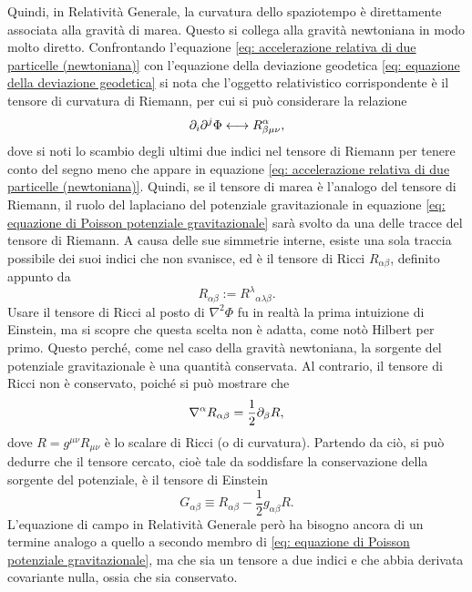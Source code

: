 Quindi, in Relatività Generale, la curvatura dello spaziotempo è direttamente associata alla gravità di marea. Questo si collega alla gravità newtoniana in modo molto diretto. Confrontando l'equazione \eqref{eq: accelerazione relativa di due particelle (newtoniana)} con l'equazione della deviazione geodetica \eqref{eq: equazione della deviazione geodetica} si nota che l'oggetto relativistico corrispondente è il tensore di curvatura di Riemann, per cui si può considerare la relazione 
\begin{equation}
    \partial_i \partial^j \Phi \longleftrightarrow R^{\alpha}_{\beta\mu\nu},
\end{equation}
dove si noti lo scambio degli ultimi due indici nel tensore di Riemann per tenere conto del segno meno che appare in equazione \eqref{eq: accelerazione relativa di due particelle (newtoniana)}. Quindi, se il tensore di marea è l'analogo del tensore di Riemann, il ruolo del laplaciano del potenziale gravitazionale in equazione \eqref{eq: equazione di Poisson potenziale gravitazionale} sarà svolto da una delle tracce del tensore di Riemann. A causa delle sue simmetrie interne, esiste una sola traccia possibile dei suoi indici che non svanisce, ed è il tensore di Ricci $R_{\alpha\beta}$, definito appunto da
\begin{equation}
    R_{\alpha\beta} := {R^\lambda}_{\alpha\lambda\beta}.
\end{equation}
Usare il tensore di Ricci al posto di $\nabla^2 \Phi$ fu in realtà la prima intuizione di Einstein, ma si scopre che questa scelta non è adatta, come notò Hilbert per primo. Questo perché, come nel caso della gravità newtoniana, la sorgente del potenziale gravitazionale è una quantità conservata. Al contrario, il tensore di Ricci non è conservato, poiché si può mostrare che
\begin{equation}
    \nabla^\alpha R_{\alpha\beta} =  \frac{1}{2}\partial_\beta R,
\end{equation}
dove $R = g^{\mu\nu} R_{\mu\nu}$ è lo scalare di Ricci (o di curvatura). Partendo da ciò, si può dedurre che il tensore cercato, cioè tale da soddisfare la conservazione della sorgente del potenziale, è il tensore di Einstein
\begin{equation}
    G_{\alpha\beta} \equiv R_{\alpha\beta} - \frac{1}{2} g_{\alpha\beta} R.
\end{equation}
L'equazione di campo in Relatività Generale però ha bisogno ancora di un termine analogo a quello a secondo membro di \eqref{eq: equazione di Poisson potenziale gravitazionale}, ma che sia un tensore a due indici e che abbia derivata covariante nulla, ossia che sia conservato. 

